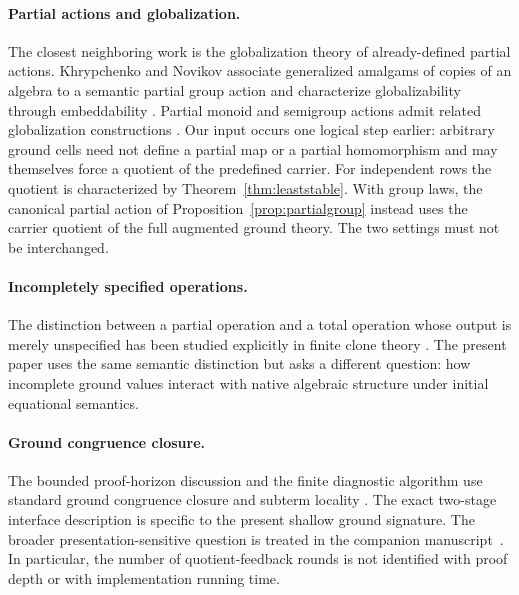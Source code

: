 \paragraph{Partial actions and globalization.}
The closest neighboring work is the globalization theory of already-defined partial actions.  Khrypchenko and Novikov associate generalized amalgams of copies of an algebra to a semantic partial group action and characterize globalizability through embeddability \cite{KhrypchenkoNovikov2018}.  Partial monoid and semigroup actions admit related globalization constructions \cite{Hollings2007,KudryavtsevaLaan2023,KhrypchenkoKlock2024}.  Our input occurs one logical step earlier: arbitrary ground cells need not define a partial map or a partial homomorphism and may themselves force a quotient of the predefined carrier.  For independent rows the quotient is characterized by
Theorem~\ref{thm:leaststable}. With group laws, the canonical partial action
of Proposition~\ref{prop:partialgroup} instead uses the carrier quotient
of the full augmented ground theory. The two settings must not be
interchanged.

\paragraph{Incompletely specified operations.}
The distinction between a partial operation and a total operation whose output is merely unspecified has been studied explicitly in finite clone theory \cite{ColicMachidaPantovic2012,ColicMachidaPantovic2014}.  The present paper uses the same semantic distinction but asks a different question: how incomplete ground values interact with native algebraic structure under initial equational semantics.

\paragraph{Ground congruence closure.}
The bounded proof-horizon discussion and the finite diagnostic algorithm use standard ground congruence closure and subterm locality \cite{NelsonOppen1980,DowneySethiTarjan1980}.  The exact two-stage interface description is specific to the present
shallow ground signature. The broader presentation-sensitive question is
treated in the companion manuscript~\cite{ShcherbakovII}. In particular,
the number of quotient-feedback rounds is not identified with proof depth
or with implementation running time.

